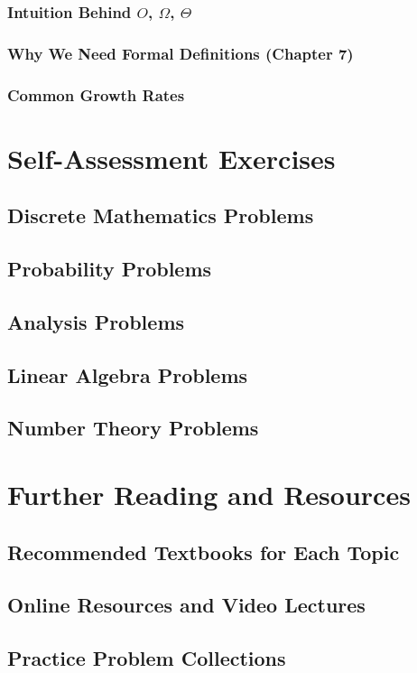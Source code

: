 \subsubsection{Intuition Behind $O$, $\Omega$, $\Theta$}
\subsubsection{Why We Need Formal Definitions (Chapter 7)}
\subsubsection{Common Growth Rates}

\section{Self-Assessment Exercises}
\subsection{Discrete Mathematics Problems}
\subsection{Probability Problems}
\subsection{Analysis Problems}
\subsection{Linear Algebra Problems}
\subsection{Number Theory Problems}

\section{Further Reading and Resources}
\subsection{Recommended Textbooks for Each Topic}
\subsection{Online Resources and Video Lectures}
\subsection{Practice Problem Collections}
